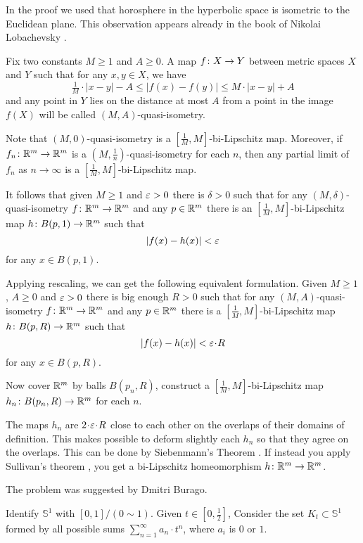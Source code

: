 In the proof we used that horosphere in the hyperbolic space is isometric to the Euclidean plane.
This observation appears already in the book of Nikolai Lobachevsky \cite[see 34 in][]{lobachevsky}.

Fix two constants $M\ge 1$ and $A\ge 0$.
A map $f\:X\z\to Y$ between metric spaces $X$ and $Y$ such that for any $x,y\in X$,
 we have
\[\tfrac1M\cdot |x-y|-A\le |f(x)-f(y)|\le M\cdot |x-y|+A\]
and any point in $Y$ lies on the distance at most $A$ from a point in the image $f(X)$
will be called $(M,A)$-quasi-isometry.

{\sloppy
Note that $(M,0)$-quasi-isometry is a $[\tfrac1M,M]$-bi-Lipschitz map.
Moreover,
if $f_n\colon\mathbb{R}^m\to\mathbb{R}^m$ is a  $(M,\frac1n)$-quasi-isometry 
for each $n$, 
then any partial limit of $f_n$ as $n\to\infty$
is a $[\tfrac1M,M]$-bi-Lipschitz map.

}

It follows that given $M\ge 1$ and $\varepsilon>0$ there is $\delta>0$ such that 
for any $(M,\delta)$-quasi-isometry $f\colon\mathbb{R}^m\to\mathbb{R}^m$ and any $p\in \mathbb{R}^m$
there is an $[\tfrac1M,M]$-bi-Lipschitz map $h\colon B(p,1)\to \mathbb{R}^m$
such that
\[|f(x)-h(x)|<\varepsilon\]
for any $x\in B(p,1)$.

Applying rescaling, we can get the following equivalent formulation. 
Given $M\ge 1$, $A\ge 0$ and $\varepsilon>0$
there is big enough $R>0$ such that for any $(M,A)$-quasi-isometry 
$f\colon\mathbb{R}^m\to\mathbb{R}^m$ and any $p\in\mathbb{R}^m$ there is a $[\tfrac1M,M]$-bi-Lipschitz map $h\colon B(p,R)\to \mathbb{R}^m$
such that 
\[|f(x)-h(x)|<\eps\cdot R\]
for any $x\in B(p,R)$.

Now cover $\mathbb{R}^m$ by balls
$B(p_n,R)$, construct a $[\tfrac1M,M]$-bi-Lipschitz map $h_n\colon B(p_n,R)\to \mathbb{R}^m$ for each $n$.

The maps $h_n$ are $2\cdot \eps\cdot R$ close to each other on the overlaps of their domains of definition.
This makes possible to deform slightly each $h_n$ so that they agree on the overlaps.
This can be done by Siebenmann's Theorem \cite{siebenmann}.
If instead you apply Sullivan's theorem \cite{sullivan}, you get a bi-Lipschitz homeomorphism $h\colon\mathbb{R}^m\to\mathbb{R}^m$.\qeds


The problem was suggested by Dmitri Burago.





Identify $\mathbb{S}^1$ with $[0,1]/(0\sim 1)$.
Given $t\in[0,\tfrac12]$,
Consider the set $K_t\subset \mathbb{S}^1$
formed by all possible sums $\sum_{n=1}^\infty a_n\cdot t^n$,
where $a_i$ is $0$ or $1$.

